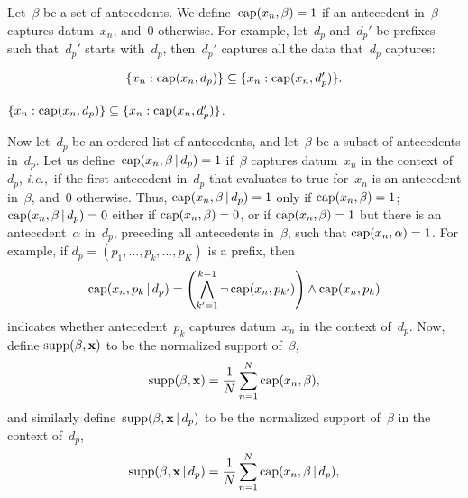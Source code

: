 \documentclass[twoside,11pt]{article}
\def\ie{{\it i.e.},~}
\newcommand{\x}{\mathbf{x}}
\def\Prefix{d_p}
\def\Cap{\textnormal{cap}}
\def\Supp{\textnormal{supp}}
\newcommand{\given}{\,|\,}
\begin{document}
Let~$\beta$ be a set of antecedents.
%
We define~${\Cap(x_n, \beta) = 1}$ if an antecedent in~$\beta$
captures datum~$x_n$, and~0 otherwise.
%
For example, let~$\Prefix$ and~$\Prefix'$ be prefixes such that~$\Prefix'$ starts
with~$\Prefix$, then~$\Prefix'$ captures all the data that~$\Prefix$ captures:
\begin{arxiv}
\begin{align*}
\{x_n: \Cap(x_n, \Prefix)\} \subseteq \{x_n: \Cap(x_n, \Prefix')\}.
\end{align*}
\end{arxiv}
\begin{kdd}
${\{x_n: \Cap(x_n, \Prefix)\} \subseteq \{x_n: \Cap(x_n, \Prefix')\}}$.
\end{kdd}

Now let~$\Prefix$ be an ordered list of antecedents,
and let~$\beta$ be a subset of antecedents in~$\Prefix$.
%
Let us define~${\Cap(x_n, \beta \given \Prefix) = 1}$ if~$\beta$
captures datum~$x_n$ in the context of~$\Prefix$,
\ie if the first antecedent in~$\Prefix$ that evaluates to true for~$x_n$
is an antecedent in~$\beta$, and~0 otherwise.
%
Thus, ${\Cap(x_n, \beta \given \Prefix) = 1}$ only if ${\Cap(x_n, \beta) = 1}$;
${\Cap(x_n, \beta \given \Prefix) = 0}$ either if ${\Cap(x_n, \beta) = 0}$,
or if ${\Cap(x_n, \beta) = 1}$ but there is an antecedent~$\alpha$ in~$\Prefix$,
preceding all antecedents in~$\beta$, such that ${\Cap(x_n, \alpha) = 1}$.
%
For example, if ${\Prefix = (p_1, \dots, p_k, \dots, p_K)}$ is a prefix, then
\begin{align*}
\Cap(x_n, p_k \given \Prefix) =
  \left(\bigwedge_{k'=1}^{k - 1} \neg\, \Cap(x_n, p_{k'}) \right)
  \wedge \Cap(x_n, p_k)
\end{align*}
indicates whether antecedent~$p_k$ captures datum~$x_n$ in the context of~$\Prefix$.
%
Now, define ${\Supp(\beta, \x)}$ to be the normalized support of~$\beta$,
\begin{align}
\Supp(\beta, \x) = \frac{1}{N} \sum_{n=1}^N \Cap(x_n, \beta),
\label{eq:support}
\end{align}
and similarly define~${\Supp(\beta, \x \given \Prefix)}$
to be the normalized support of~$\beta$ in the context of~$\Prefix$,
\begin{align}
\Supp(\beta, \x \given \Prefix) = \frac{1}{N} \sum_{n=1}^N \Cap(x_n, \beta \given \Prefix),
\label{eq:support-context}
\end{align}
\end{document}
